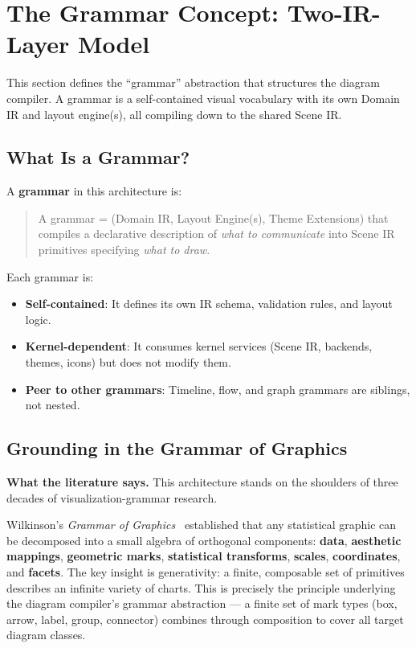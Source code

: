 \section{The Grammar Concept: Two-IR-Layer Model}
\label{sec:grammar-concept}

This section defines the ``grammar'' abstraction that structures the diagram compiler. A grammar is a self-contained visual vocabulary with its own Domain IR and layout engine(s), all compiling down to the shared Scene IR.

\subsection{What Is a Grammar?}

A \textbf{grammar} in this architecture is:

\begin{quote}
A grammar = (Domain IR, Layout Engine(s), Theme Extensions) that compiles a declarative description of \emph{what to communicate} into Scene IR primitives specifying \emph{what to draw}.
\end{quote}

Each grammar is:
\begin{itemize}
  \item \textbf{Self-contained}: It defines its own IR schema, validation rules, and layout logic.
  \item \textbf{Kernel-dependent}: It consumes kernel services (Scene IR, backends, themes, icons) but does not modify them.
  \item \textbf{Peer to other grammars}: Timeline, flow, and graph grammars are siblings, not nested.
\end{itemize}

\subsection{Grounding in the Grammar of Graphics}
\label{sec:grammar-gog}

\textbf{What the literature says.}
This architecture stands on the shoulders of three decades of
visualization-grammar research.

Wilkinson's \emph{Grammar of Graphics}~\cite{grammarofgraphics2005}
established that any statistical graphic can be decomposed into a small
algebra of orthogonal components: \textbf{data}, \textbf{aesthetic
mappings}, \textbf{geometric marks}, \textbf{statistical transforms},
\textbf{scales}, \textbf{coordinates}, and \textbf{facets}.
The key insight is generativity: a finite, composable set of primitives
describes an infinite variety of charts.
This is precisely the principle underlying the diagram compiler's grammar
abstraction --- a finite set of mark types (box, arrow, label, group,
connector) combines through composition to cover all target diagram classes.

